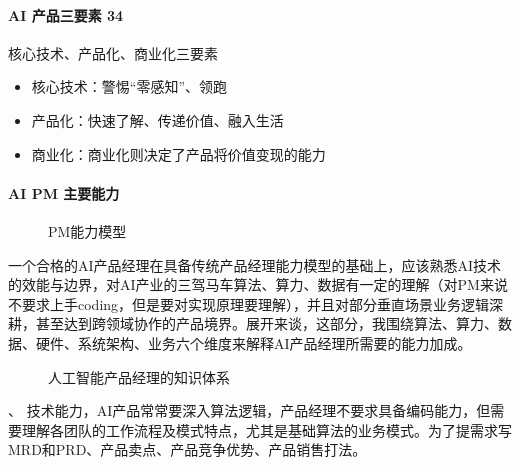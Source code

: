 \documentclass[letterpaper,10pt,english]{sphinxmanual}
\begin{document}
\paragraph{AI 产品三要素 34\sphinxfootnotemark[274]}
\label{\detokenize{chapter_introduction/AI_PM:ai-34}}%
\begin{footnotetext}[274]\sphinxAtStartFootnote
{}
%
\end{footnotetext}\ignorespaces 
核心技术、产品化、商业化三要素
\begin{itemize}
\item {} 
核心技术：警惕“零感知”、领跑

\item {} 
产品化：快速了解、传递价值、融入生活

\item {} 
商业化：商业化则决定了产品将价值变现的能力

\end{itemize}


\paragraph{AI PM 主要能力}
\label{\detokenize{chapter_introduction/AI_PM:ai-pm}}
\begin{figure}[H]
\centering
\capstart

\noindent{}
\caption{PM能力模型}\label{\detokenize{chapter_introduction/AI_PM:id51}}\end{figure}

一个合格的AI产品经理在具备传统产品经理能力模型的基础上，应该熟悉AI技术的效能与边界，对AI产业的三驾马车算法、算力、数据有一定的理解（对PM来说不要求上手coding，但是要对实现原理要理解），并且对部分垂直场景业务逻辑深耕，甚至达到跨领域协作的产品境界。展开来谈，这部分，我围绕算法、算力、数据、硬件、系统架构、业务六个维度来解释AI产品经理所需要的能力加成。%
\begin{footnote}[275]\sphinxAtStartFootnote
{}
%
\end{footnote}

\begin{figure}[H]
\centering
\capstart

\noindent{}
\caption{人工智能产品经理的知识体系\sphinxfootnotemark[276]}\label{\detokenize{chapter_introduction/AI_PM:id52}}\end{figure}
%
\begin{footnotetext}[276]\sphinxAtStartFootnote
{}
%
\end{footnotetext}、
技术能力，AI产品常常要深入算法逻辑，产品经理不要求具备编码能力，但需要理解各团队的工作流程及模式特点，尤其是基础算法的业务模式。为了提需求写MRD和PRD、产品卖点、产品竞争优势、产品销售打法。
\end{document}
